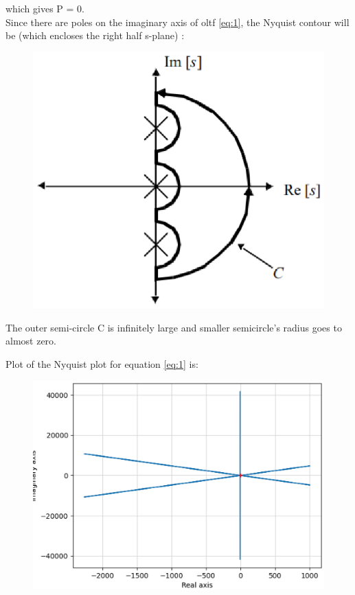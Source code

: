 \begin{enumerate}[label=\thesubsection.\arabic*.,ref=\thesubsection.\theenumi]
which gives P = 0.\\
Since there are poles on the imaginary axis of oltf \ref{eq:1}, the Nyquist contour will be (which encloses the right half s-plane)  : \\
\begin{figure}[ht!]
    \includegraphics[width=\columnwidth]{./figs/ee18btech11025/splane.eps}
    \caption{}
    \label{fig:splane}
\end{figure}
The outer semi-circle C is infinitely large and smaller semicircle's radius goes to almost zero.

Plot of the Nyquist plot for equation \ref{eq:1} is:
\begin{figure}[ht!]
    \includegraphics[width=\columnwidth]{./figs/ee18btech11025/g.eps}
    \caption{}
    \label{fig:nyqplot}
\end{figure}


\end{enumerate}
